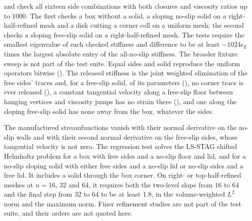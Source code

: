 and 
check all sixteen side combinations with both closures and viscosity ratios
up to $1000$. The first checks a box without a solid, a sloping no-slip solid
on a right-half-refined mesh and a disk cutting a corner cell on a uniform
mesh; the second checks a sloping free-slip solid on a right-half-refined
mesh. The tests require the smallest eigenvalue of each checked stiffness and
difference to be at least $-1024\epsilon_{\mathrm{fl}}$ times the largest absolute
entry of the all-no-slip stiffness.
The broader fixture sweep is not part of the test suite.
Equal sides and solid reproduce the uniform
operators bitwise
().
The released
stiffness is the joint weighted elimination of the free sides' traces and,
for a free-slip solid, of its parameters
(),
no corner trace is ever released
(),
a constant tangential velocity along a free-slip floor between hanging
vertices and viscosity jumps has no strain there
(),
and one along the sloping free-slip solid has none away from the box,
whatever the sides.

The manufactured streamfunctions vanish with their normal derivative on the
no-slip walls and with their second normal derivative on the free-slip
sides, whose tangential velocity is not zero. The regression test
solves the LS-STAG shifted Helmholtz problem for a box with free sides and a
no-slip floor and lid, and for a no-slip sloping solid with either free sides
and a no-slip lid or no-slip sides and a free lid. It includes a solid through
the box corner. On right- or top-half-refined meshes at $n=16$, $32$ and $64$,
it requires both the two-level slope from $16$ to $64$ and the final step from
$32$ to $64$ to be at least $1.8$, in the volume-weighted $L^2$ norm and the
maximum norm. Finer refinement studies are not part of the test suite, and
their orders are not quoted here.

